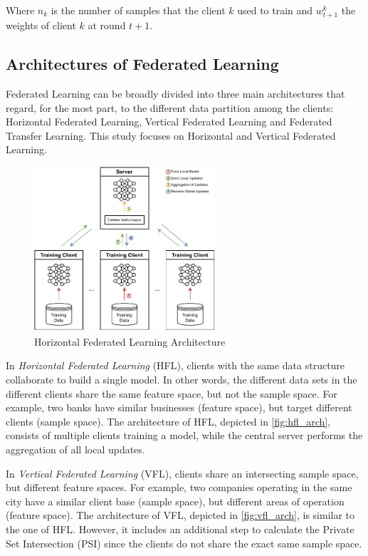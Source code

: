 Where $n_k$ is the number of samples that the client $k$ used to train and $w_{t+1}^k$ the weights of client $k$ at round $t+1$.

\subsection{Architectures of Federated Learning}

Federated Learning can be broadly divided into three main architectures \cite{10.1145/3298981, 10.1145/3412357} that regard, for the most part, to the different data partition among the clients: Horizontal Federated Learning, Vertical Federated Learning and Federated Transfer Learning. This study focuses on Horizontal and Vertical Federated Learning.

\begin{figure}[!ht]
    \centering
    \centering
    \includegraphics[width=0.6\textwidth]{graphics/hfl-architecture.pdf}
    \caption{Horizontal Federated Learning Architecture}
    \label{fig:hfl_arch}
\end{figure}

In \textit{Horizontal Federated Learning} (HFL), clients with the same data structure collaborate to build a single model. In other words, the different data sets in the different clients share the same feature space, but not the sample space. For example, two banks have similar businesses (feature space), but target different clients (sample space). The architecture of HFL, depicted in \autoref{fig:hfl_arch}, consists of multiple clients training a model, while the central server performs the aggregation of all local updates.

In \textit{Vertical Federated Learning} (VFL), clients share an intersecting sample space, but different feature spaces. For example, two companies operating in the same city have a similar client base (sample space), but different areas of operation (feature space). The architecture of VFL, depicted in \autoref{fig:vfl_arch}, is similar to the one of HFL. However, it includes an additional step to calculate the Private Set Intersection (PSI) since the clients do not share the exact same sample space.

